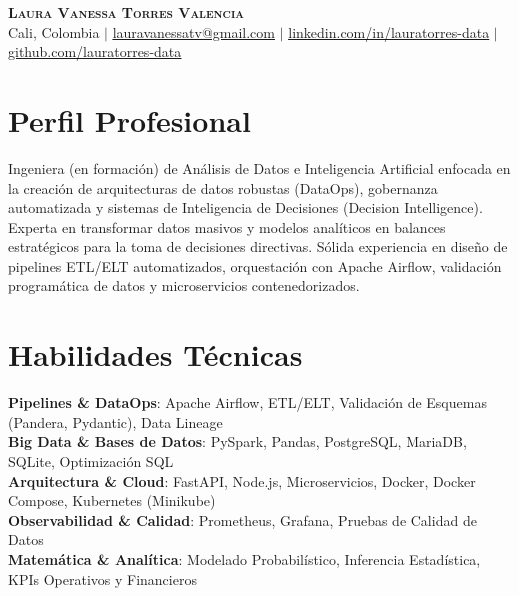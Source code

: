 \documentclass[letterpaper,11pt]{article}
\begin{document}
\begin{center}
    \textbf{\Huge \scshape Laura Vanessa Torres Valencia} \\ \vspace{1pt}
    \small Cali, Colombia $|$ 
    \href{mailto:lauravanessatv@gmail.com}{\underline{lauravanessatv@gmail.com}} $|$ 
    \href{https://linkedin.com/in/lauratorres-data}{\underline{linkedin.com/in/lauratorres-data}} $|$ 
    \href{https://github.com/lauratorres-data}{\underline{github.com/lauratorres-data}}
\end{center}

\section{Perfil Profesional}
\small{Ingeniera (en formación) de Análisis de Datos e Inteligencia Artificial enfocada en la creación de arquitecturas de datos robustas (DataOps), gobernanza automatizada y sistemas de Inteligencia de Decisiones (Decision Intelligence). Experta en transformar datos masivos y modelos analíticos en balances estratégicos para la toma de decisiones directivas. Sólida experiencia en diseño de pipelines ETL/ELT automatizados, orquestación con Apache Airflow, validación programática de datos y microservicios contenedorizados.}

\section{Habilidades Técnicas}
 \begin{itemize}[leftmargin=0.15in, label={}]
    \small{\item{
     \textbf{Pipelines \& DataOps}{: Apache Airflow, ETL/ELT, Validación de Esquemas (Pandera, Pydantic), Data Lineage} \\
     \textbf{Big Data \& Bases de Datos}{: PySpark, Pandas, PostgreSQL, MariaDB, SQLite, Optimización SQL} \\
     \textbf{Arquitectura \& Cloud}{: FastAPI, Node.js, Microservicios, Docker, Docker Compose, Kubernetes (Minikube)} \\
     \textbf{Observabilidad \& Calidad}{: Prometheus, Grafana, Pruebas de Calidad de Datos} \\
     \textbf{Matemática \& Analítica}{: Modelado Probabilístico, Inferencia Estadística, KPIs Operativos y Financieros}
    }}
 \end{itemize}
\end{document}
